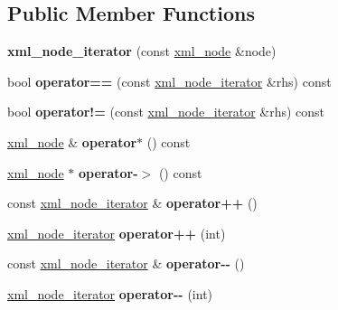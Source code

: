 \subsection*{Public Member Functions}
\begin{DoxyCompactItemize}
\item 
\mbox{\label{classpugi_1_1xml__node__iterator_ae3500aff28fb786c1ea4ee33ffcb0538}} 
{\bfseries xml\+\_\+node\+\_\+iterator} (const \hyperlink{classpugi_1_1xml__node}{xml\+\_\+node} \&node)
\item 
\mbox{\label{classpugi_1_1xml__node__iterator_a7b50d90cf2556932610cb8c7ff88d908}} 
bool {\bfseries operator==} (const \hyperlink{classpugi_1_1xml__node__iterator}{xml\+\_\+node\+\_\+iterator} \&rhs) const
\item 
\mbox{\label{classpugi_1_1xml__node__iterator_ac611cf85ec5a9904313b2d40891a798e}} 
bool {\bfseries operator!=} (const \hyperlink{classpugi_1_1xml__node__iterator}{xml\+\_\+node\+\_\+iterator} \&rhs) const
\item 
\mbox{\label{classpugi_1_1xml__node__iterator_afa9482ebe240ac298f77fbe5cb46ca26}} 
\hyperlink{classpugi_1_1xml__node}{xml\+\_\+node} \& {\bfseries operator$\ast$} () const
\item 
\mbox{\label{classpugi_1_1xml__node__iterator_aa8586c3531a00c556978c75fbd56b504}} 
\hyperlink{classpugi_1_1xml__node}{xml\+\_\+node} $\ast$ {\bfseries operator-\/$>$} () const
\item 
\mbox{\label{classpugi_1_1xml__node__iterator_ae61e3ce20a2d0d999241e19e695035a5}} 
const \hyperlink{classpugi_1_1xml__node__iterator}{xml\+\_\+node\+\_\+iterator} \& {\bfseries operator++} ()
\item 
\mbox{\label{classpugi_1_1xml__node__iterator_a5e8d05f7bf71bfc99b8d438dc480658c}} 
\hyperlink{classpugi_1_1xml__node__iterator}{xml\+\_\+node\+\_\+iterator} {\bfseries operator++} (int)
\item 
\mbox{\label{classpugi_1_1xml__node__iterator_a83ff5311f3d71c127e89a5cf6bf9d361}} 
const \hyperlink{classpugi_1_1xml__node__iterator}{xml\+\_\+node\+\_\+iterator} \& {\bfseries operator-\/-\/} ()
\item 
\mbox{\label{classpugi_1_1xml__node__iterator_a85c3618b5bb64a3e8695335e80475804}} 
\hyperlink{classpugi_1_1xml__node__iterator}{xml\+\_\+node\+\_\+iterator} {\bfseries operator-\/-\/} (int)
\end{DoxyCompactItemize}
